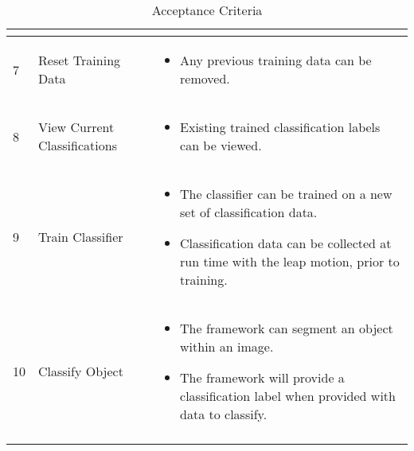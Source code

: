 \begin{center}
\begin{longtable}{p{}|p{}|p{}}
\begin{itemize}
												  \end{itemize}                            \\ \hline
7                & Reset Training Data          &  \begin{itemize}
												  	\item Any previous training data can be removed.
												  \end{itemize}                            \\ \hline
8                & View Current Classifications &  \begin{itemize}
												  	\item Existing trained classification labels can be viewed.
												  \end{itemize}                            \\ \hline
9                & Train Classifier             &  \begin{itemize}
												  	\item The classifier can be trained on a new set of classification data.
												  	\item Classification data can be collected at run time with the leap motion, prior to training.
												  \end{itemize}                            \\ \hline
10               & Classify Object              &  \begin{itemize}
													\item The framework can segment an object within an image.
												  	\item The framework will provide a classification label when provided with data to classify.
												  \end{itemize}                            \\ \hline
\caption{Acceptance Criteria \protect {\label{tab:acc_criteria}}}
\end{longtable}

\end{center}